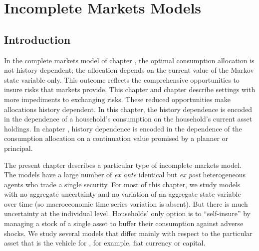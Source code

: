 
%

%

%
%


\chapter{Incomplete Markets Models\label{incomplete}}
\offparens
\section{Introduction}

 In the complete markets model of chapter ,
the optimal consumption allocation is not history dependent; the allocation
depends on the current value of the  Markov state variable only.  This
outcome reflects the comprehensive opportunities to insure risks that
markets provide.   This chapter and chapter 
describe settings with more impediments to exchanging risks.  These
reduced opportunities make allocations history dependent.  In this
chapter, the history dependence is encoded in the dependence
of a household's  consumption on the household's current asset
holdings.  In chapter , history dependence
is encoded in the dependence of the consumption allocation on a
continuation value promised by a planner or principal.

%
%
  The present chapter describes a particular type of incomplete
markets model.
 The models have a large number of {\it ex ante\/} identical but
{\it ex post\/} heterogeneous agents who trade a single security.
For most of this chapter, we study models with no
aggregate uncertainty and no variation of an aggregate
state variable over time (so macroeconomic time series
variation is absent).  But there is much uncertainty at
the individual level.  Households' only option
is to ``self-insure''  by managing a
stock of a single  asset to buffer their consumption against
adverse shocks.  We study several models that differ mainly
with respect to the particular asset that is the vehicle
for ,
for example, fiat currency or  capital.
%

